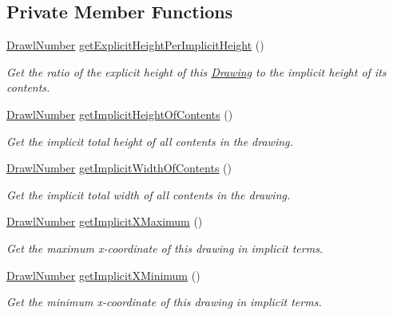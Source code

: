 \subsection*{Private Member Functions}
\begin{DoxyCompactItemize}
\item 
\hyperlink{classcom_1_1aarrelaakso_1_1drawl_1_1_drawl_number}{Drawl\+Number} \hyperlink{classcom_1_1aarrelaakso_1_1drawl_1_1_drawing_ab4be923426dabfdaffecb5b3ff22b95b}{get\+Explicit\+Height\+Per\+Implicit\+Height} ()
\begin{DoxyCompactList}\small\item\em Get the ratio of the explicit height of this \hyperlink{classcom_1_1aarrelaakso_1_1drawl_1_1_drawing}{Drawing} to the implicit height of its contents. \end{DoxyCompactList}\item 
\hyperlink{classcom_1_1aarrelaakso_1_1drawl_1_1_drawl_number}{Drawl\+Number} \hyperlink{classcom_1_1aarrelaakso_1_1drawl_1_1_drawing_a9c53863b57c91b1b6ccc63cba9e0c73c}{get\+Implicit\+Height\+Of\+Contents} ()
\begin{DoxyCompactList}\small\item\em Get the implicit total height of all contents in the drawing. \end{DoxyCompactList}\item 
\hyperlink{classcom_1_1aarrelaakso_1_1drawl_1_1_drawl_number}{Drawl\+Number} \hyperlink{classcom_1_1aarrelaakso_1_1drawl_1_1_drawing_a8e2e3b749b0b3714e0e7a25d71b02e93}{get\+Implicit\+Width\+Of\+Contents} ()
\begin{DoxyCompactList}\small\item\em Get the implicit total width of all contents in the drawing. \end{DoxyCompactList}\item 
\hyperlink{classcom_1_1aarrelaakso_1_1drawl_1_1_drawl_number}{Drawl\+Number} \hyperlink{classcom_1_1aarrelaakso_1_1drawl_1_1_drawing_abc22e4c627cf1d542b1278d22b388afb}{get\+Implicit\+X\+Maximum} ()
\begin{DoxyCompactList}\small\item\em Get the maximum x-\/coordinate of this drawing in implicit terms. \end{DoxyCompactList}\item 
\hyperlink{classcom_1_1aarrelaakso_1_1drawl_1_1_drawl_number}{Drawl\+Number} \hyperlink{classcom_1_1aarrelaakso_1_1drawl_1_1_drawing_ac2caf8d67e6336d7d64f63711e149640}{get\+Implicit\+X\+Minimum} ()
\begin{DoxyCompactList}\small\item\em Get the minimum x-\/coordinate of this drawing in implicit terms. \end{DoxyCompactList}\item 

\end{DoxyCompactItemize}
